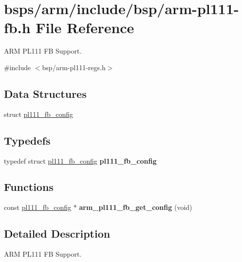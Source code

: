 \hypertarget{arm-pl111-fb_8h}{}\section{bsps/arm/include/bsp/arm-\/pl111-\/fb.h File Reference}
\label{arm-pl111-fb_8h}


A\+RM P\+L111 FB Support.  


{\ttfamily \#include $<$bsp/arm-\/pl111-\/regs.\+h$>$}\newline
\subsection*{Data Structures}
\begin{DoxyCompactItemize}
\item 
struct \mbox{\hyperlink{structpl111__fb__config}{pl111\+\_\+fb\+\_\+config}}
\end{DoxyCompactItemize}
\subsection*{Typedefs}
\begin{DoxyCompactItemize}
\item 
\mbox{\label{arm-pl111-fb_8h_a441f130cef135afde15e3ef972353903}} 
typedef struct \mbox{\hyperlink{structpl111__fb__config}{pl111\+\_\+fb\+\_\+config}} {\bfseries pl111\+\_\+fb\+\_\+config}
\end{DoxyCompactItemize}
\subsection*{Functions}
\begin{DoxyCompactItemize}
\item 
\mbox{\label{arm-pl111-fb_8h_a1526b30d1e8352f00a64d899ee478c42}} 
const \mbox{\hyperlink{structpl111__fb__config}{pl111\+\_\+fb\+\_\+config}} $\ast$ {\bfseries arm\+\_\+pl111\+\_\+fb\+\_\+get\+\_\+config} (void)
\end{DoxyCompactItemize}


\subsection{Detailed Description}
A\+RM P\+L111 FB Support. 

